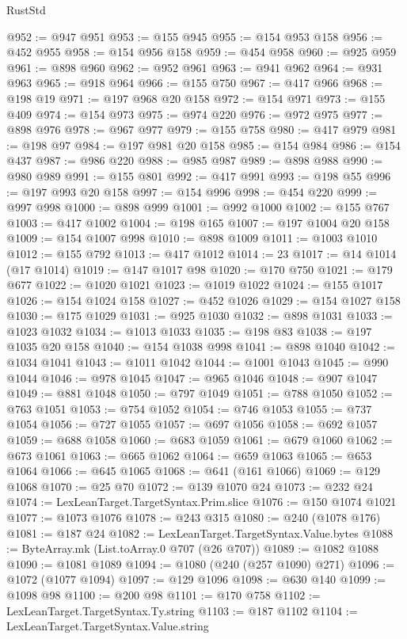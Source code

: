 \begin{lexlean}{RustStd}
\begin{coremodule}
@952 := @947 @951
@953 := @155 @945
@955 := @154 @953 @158
@956 := @452 @955
@958 := @154 @956 @158
@959 := @454 @958
@960 := @925 @959
@961 := @898 @960
@962 := @952 @961
@963 := @941 @962
@964 := @931 @963
@965 := @918 @964
@966 := @155 @750
@967 := @417 @966
@968 := @198 @19
@971 := @197 @968 @20 @158
@972 := @154 @971
@973 := @155 @409
@974 := @154 @973
@975 := @974 @220
@976 := @972 @975
@977 := @898 @976
@978 := @967 @977
@979 := @155 @758
@980 := @417 @979
@981 := @198 @97
@984 := @197 @981 @20 @158
@985 := @154 @984
@986 := @154 @437
@987 := @986 @220
@988 := @985 @987
@989 := @898 @988
@990 := @980 @989
@991 := @155 @801
@992 := @417 @991
@993 := @198 @55
@996 := @197 @993 @20 @158
@997 := @154 @996
@998 := @454 @220
@999 := @997 @998
@1000 := @898 @999
@1001 := @992 @1000
@1002 := @155 @767
@1003 := @417 @1002
@1004 := @198 @165
@1007 := @197 @1004 @20 @158
@1009 := @154 @1007 @998
@1010 := @898 @1009
@1011 := @1003 @1010
@1012 := @155 @792
@1013 := @417 @1012
@1014 := 23
@1017 := @14 @1014 (@17 @1014)
@1019 := @147 @1017 @98
@1020 := @170 @750
@1021 := @179 @677
@1022 := @1020 @1021
@1023 := @1019 @1022
@1024 := @155 @1017
@1026 := @154 @1024 @158
@1027 := @452 @1026
@1029 := @154 @1027 @158
@1030 := @175 @1029
@1031 := @925 @1030
@1032 := @898 @1031
@1033 := @1023 @1032
@1034 := @1013 @1033
@1035 := @198 @83
@1038 := @197 @1035 @20 @158
@1040 := @154 @1038 @998
@1041 := @898 @1040
@1042 := @1034 @1041
@1043 := @1011 @1042
@1044 := @1001 @1043
@1045 := @990 @1044
@1046 := @978 @1045
@1047 := @965 @1046
@1048 := @907 @1047
@1049 := @881 @1048
@1050 := @797 @1049
@1051 := @788 @1050
@1052 := @763 @1051
@1053 := @754 @1052
@1054 := @746 @1053
@1055 := @737 @1054
@1056 := @727 @1055
@1057 := @697 @1056
@1058 := @692 @1057
@1059 := @688 @1058
@1060 := @683 @1059
@1061 := @679 @1060
@1062 := @673 @1061
@1063 := @665 @1062
@1064 := @659 @1063
@1065 := @653 @1064
@1066 := @645 @1065
@1068 := @641 (@161 @1066)
@1069 := @129 @1068
@1070 := @25 @70
@1072 := @139 @1070 @24
@1073 := @232 @24
@1074 := LexLeanTarget.TargetSyntax.Prim.slice
@1076 := @150 @1074 @1021
@1077 := @1073 @1076
@1078 := @243 @315
@1080 := @240 (@1078 @176)
@1081 := @187 @24
@1082 := LexLeanTarget.TargetSyntax.Value.bytes
@1088 := ByteArray.mk (List.toArray.{0} @707 (@26 @707))
@1089 := @1082 @1088
@1090 := @1081 @1089
@1094 := @1080 (@240 (@257 @1090) @271)
@1096 := @1072 (@1077 @1094)
@1097 := @129 @1096
@1098 := @630 @140
@1099 := @1098 @98
@1100 := @200 @98
@1101 := @170 @758
@1102 := LexLeanTarget.TargetSyntax.Ty.string
@1103 := @187 @1102
@1104 := LexLeanTarget.TargetSyntax.Value.string

\end{coremodule}
\end{lexlean}
